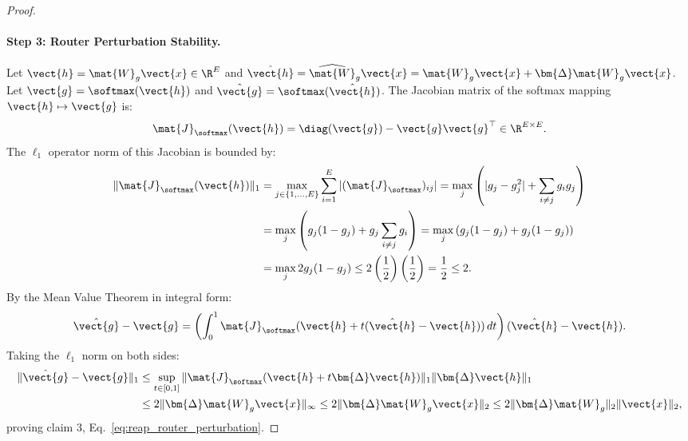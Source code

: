 \begin{proof}
\paragraph{Step 3: Router Perturbation Stability.}
Let $\vect{h} = \mat{W}_g \vect{x} \in \R^E$ and $\hat{\vect{h}} = \widehat{\mat{W}}_g \vect{x} = \mat{W}_g \vect{x} + \bm{\Delta}\mat{W}_g \vect{x}$.
Let $\vect{g} = \softmax(\vect{h})$ and $\hat{\vect{g}} = \softmax(\hat{\vect{h}})$.
The Jacobian matrix of the softmax mapping $\vect{h} \mapsto \vect{g}$ is:
\begin{equation}
\mat{J}_{\softmax}(\vect{h}) = \diag(\vect{g}) - \vect{g} \vect{g}^\top \in \R^{E \times E}.
\end{equation}
The $\ell_1$ operator norm of this Jacobian is bounded by:
\begin{align}
\|\mat{J}_{\softmax}(\vect{h})\|_1 &= \max_{j \in \{1, \dots, E\}} \sum_{i=1}^E |(\mat{J}_{\softmax})_{ij}| = \max_j \left( |g_j - g_j^2| + \sum_{i \ne j} g_i g_j \right) \nonumber \\
&= \max_j \left( g_j(1 - g_j) + g_j \sum_{i \ne j} g_i \right) = \max_j \left( g_j(1 - g_j) + g_j(1 - g_j) \right) \nonumber \\
&= \max_j 2 g_j (1 - g_j) \le 2 \left(\frac{1}{2}\right)\left(\frac{1}{2}\right) = \frac{1}{2} \le 2.
\end{align}
By the Mean Value Theorem in integral form:
\begin{equation}
\hat{\vect{g}} - \vect{g} = \left( \int_0^1 \mat{J}_{\softmax}(\vect{h} + t (\hat{\vect{h}} - \vect{h})) \, dt \right) (\hat{\vect{h}} - \vect{h}).
\end{equation}
Taking the $\ell_1$ norm on both sides:
\begin{align}
\|\hat{\vect{g}} - \vect{g}\|_1 &\le \sup_{t \in [0, 1]} \|\mat{J}_{\softmax}(\vect{h} + t \bm{\Delta}\vect{h})\|_1 \|\bm{\Delta}\vect{h}\|_1 \nonumber \\
&\le 2 \|\bm{\Delta}\mat{W}_g \vect{x}\|_\infty \le 2 \|\bm{\Delta}\mat{W}_g \vect{x}\|_2 \le 2 \|\bm{\Delta}\mat{W}_g\|_2 \|\vect{x}\|_2,
\end{align}
proving claim 3, Eq.~\eqref{eq:reap_router_perturbation}.


\end{proof}
